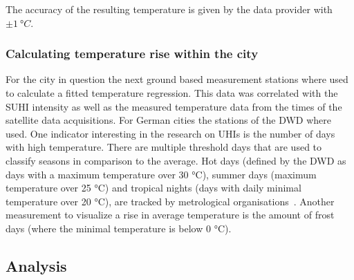 \documentclass[12pt,a4paper, english,twoside]{article}
\begin{document}
      The accuracy of the resulting temperature is given by the data provider with $\pm 1\ °C$.
  
  \newpage
    \subsubsection{Calculating temperature rise within the city}
      For the city in question the next ground based measurement stations where used to calculate a fitted temperature regression. 
      This data %
      was correlated with the \gls{SUHI} intensity as well as the measured temperature data from the times of the satellite data acquisitions. 
      For German cities the stations of the \gls{DWD} where used.
      One indicator interesting in the research on \glspl{UHI} is the number of days with high temperature.
      There are multiple threshold days that are used to classify seasons in comparison to the average.
      Hot days (defined by the \gls{DWD} as days with a maximum temperature over 30 °C), summer days (maximum temperature over 25 °C) and tropical nights (days with daily minimal temperature over 20 °C), are tracked by metrological organisations~\autocite{dwdklimalexikon}.
      Another measurement to visualize a rise in average temperature is the amount of frost days (where the minimal temperature is below 0 °C). 
      \subsection{Analysis}\label{sec:tempanalysis}
  
\end{document}

